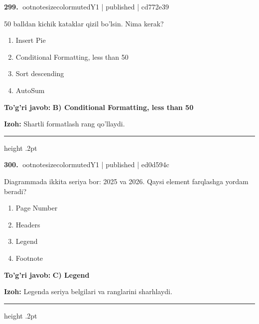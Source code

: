 \documentclass[10pt,a4paper]{article}
\begin{document}
\textbf{\color{ink}299.} {ootnotesizecolor{muted}Y1 | published | cd772e39}
\par
50 balldan kichik kataklar qizil bo'lsin. Nima kerak?
\begin{enumerate}[label=\Alph*),leftmargin=9mm]
\item Insert Pie
\item Conditional Formatting, less than 50
\item Sort descending
\item AutoSum
\end{enumerate}
\begin{tcolorbox}[enhanced,breakable,colback=teal!4,colframe=teal!55!black,boxrule=0.45pt,arc=1.2mm,left=2.8mm,right=2.8mm,top=2mm,bottom=2mm]
\textbf{\color{teal}To'g'ri javob:} \textbf{B) Conditional Formatting, less than 50}
\par\smallskip
\textbf{Izoh:} Shartli formatlash rang qo'llaydi.
\end{tcolorbox}
\vspace{2mm}\hrule height .2pt\vspace{2mm}

\textbf{\color{ink}300.} {ootnotesizecolor{muted}Y1 | published | ed0d594c}
\par
Diagrammada ikkita seriya bor: 2025 va 2026. Qaysi element farqlashga yordam beradi?
\begin{enumerate}[label=\Alph*),leftmargin=9mm]
\item Page Number
\item Headers
\item Legend
\item Footnote
\end{enumerate}
\begin{tcolorbox}[enhanced,breakable,colback=teal!4,colframe=teal!55!black,boxrule=0.45pt,arc=1.2mm,left=2.8mm,right=2.8mm,top=2mm,bottom=2mm]
\textbf{\color{teal}To'g'ri javob:} \textbf{C) Legend}
\par\smallskip
\textbf{Izoh:} Legenda seriya belgilari va ranglarini sharhlaydi.
\end{tcolorbox}
\vspace{2mm}\hrule height .2pt\vspace{2mm}
\end{document}
